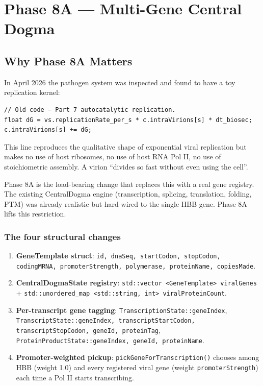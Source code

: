\documentclass[11pt,letterpaper,twoside,openany]{book}
\newcommand{\code}[1]{\texttt{#1}}
\begin{document}
\part{Phase 8A --- Multi-Gene Central Dogma}

\chapter{Why Phase 8A Matters}
\label{ch:phase8a}

In April 2026 the pathogen system was inspected and found to have a
toy replication kernel:
\begin{lstlisting}
// Old code — Part 7 autocatalytic replication.
float dG = vs.replicationRate_per_s * c.intraVirions[s] * dt_biosec;
c.intraVirions[s] += dG;
\end{lstlisting}
This line reproduces the qualitative shape of exponential viral
replication but makes no use of host ribosomes, no use of host
RNA Pol II, no use of stoichiometric assembly. A virion ``divides
so fast without even using the cell''.

Phase 8A is the load-bearing change that replaces this with a real
gene registry. The existing CentralDogma engine (transcription,
splicing, translation, folding, PTM) was already realistic but
hard-wired to the single HBB gene. Phase 8A lifts this restriction.

\section{The four structural changes}

\begin{enumerate}
  \item \textbf{GeneTemplate struct}: \code{id, dnaSeq, startCodon,
        stopCodon, codingMRNA, promoterStrength, polymerase,
        proteinName, copiesMade}.
  \item \textbf{CentralDogmaState registry}: \code{std::vector
        <GeneTemplate> viralGenes} + \code{std::unordered\_map
        <std::string, int> viralProteinCount}.
  \item \textbf{Per-transcript gene tagging}:
        \code{TranscriptionState::geneIndex},
        \code{TranscriptState::{geneIndex, transcriptStartCodon,
        transcriptStopCodon, geneId, proteinTag}},
        \code{ProteinProductState::{geneIndex, geneId, proteinName}}.
  \item \textbf{Promoter-weighted pickup}: \code{pickGeneForTranscription()}
        chooses among HBB (weight 1.0) and every registered viral
        gene (weight \code{promoterStrength}) each time a Pol II
        starts transcribing.
\end{enumerate}
\end{document}
